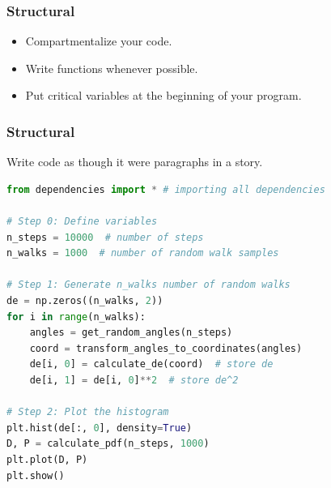 \begin{frame}[fragile]
  \frametitle{Structural}
  \begin{itemize}
      \item Compartmentalize your code.
      \item Write functions whenever possible.
      \item Put critical variables at the beginning of your program.
  \end{itemize}  
\end{frame}

\begin{frame}[fragile]
  \frametitle{Structural}
    Write code as though it were paragraphs in a story.
    \begin{lstlisting}[language=Python,basicstyle=\scriptsize]
from dependencies import * # importing all dependencies

# Step 0: Define variables
n_steps = 10000  # number of steps
n_walks = 1000  # number of random walk samples

# Step 1: Generate n_walks number of random walks
de = np.zeros((n_walks, 2))
for i in range(n_walks):
    angles = get_random_angles(n_steps)
    coord = transform_angles_to_coordinates(angles)
    de[i, 0] = calculate_de(coord)  # store de
    de[i, 1] = de[i, 0]**2  # store de^2

# Step 2: Plot the histogram
plt.hist(de[:, 0], density=True)
D, P = calculate_pdf(n_steps, 1000)
plt.plot(D, P)
plt.show()
    \end{lstlisting}
\end{frame}


